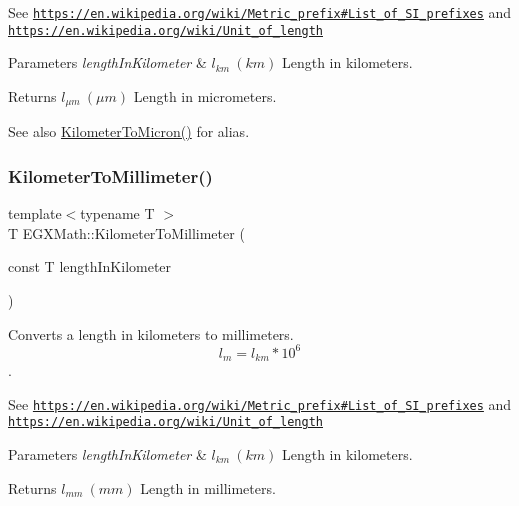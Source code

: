 See \href{https://en.wikipedia.org/wiki/Metric_prefix#List_of_SI_prefixes}{\tt https\+://en.\+wikipedia.\+org/wiki/\+Metric\+\_\+prefix\#\+List\+\_\+of\+\_\+\+S\+I\+\_\+prefixes} and \href{https://en.wikipedia.org/wiki/Unit_of_length}{\tt https\+://en.\+wikipedia.\+org/wiki/\+Unit\+\_\+of\+\_\+length} 
\begin{DoxyParams}{Parameters}
{\em length\+In\+Kilometer} & $ l_{km}\ (km)$ Length in kilometers. \\
\hline
\end{DoxyParams}
\begin{DoxyReturn}{Returns}
$ l_{\mu m}\ (\mu m)$ Length in micrometers. 
\end{DoxyReturn}
\begin{DoxySeeAlso}{See also}
\mbox{\hyperlink{group___e_g_x_math-_conversions-_length_conversions-_kilometer-_non-_s_i_gae662bafe0d1fc36276a336fd969307a0}{Kilometer\+To\+Micron()}} for alias. 
\end{DoxySeeAlso}
\mbox{\label{group___e_g_x_math-_conversions-_length_conversions-_kilometer-_s_i_ga109bb9ca348173d3bfd643a4e3bd3686}} 
\subsubsection{\texorpdfstring{Kilometer\+To\+Millimeter()}{KilometerToMillimeter()}}
{\footnotesize\ttfamily template$<$typename T $>$ \\
T E\+G\+X\+Math\+::\+Kilometer\+To\+Millimeter (\begin{DoxyParamCaption}\item[{const T}]{length\+In\+Kilometer }\end{DoxyParamCaption})}



Converts a length in kilometers to millimeters. \[ l_{m}=l_{km} * 10^{6} \]. 

See \href{https://en.wikipedia.org/wiki/Metric_prefix#List_of_SI_prefixes}{\tt https\+://en.\+wikipedia.\+org/wiki/\+Metric\+\_\+prefix\#\+List\+\_\+of\+\_\+\+S\+I\+\_\+prefixes} and \href{https://en.wikipedia.org/wiki/Unit_of_length}{\tt https\+://en.\+wikipedia.\+org/wiki/\+Unit\+\_\+of\+\_\+length} 
\begin{DoxyParams}{Parameters}
{\em length\+In\+Kilometer} & $ l_{km}\ (km)$ Length in kilometers. \\
\hline
\end{DoxyParams}
\begin{DoxyReturn}{Returns}
$ l_{mm}\ (mm)$ Length in millimeters. 
\end{DoxyReturn}
\mbox{\label{group___e_g_x_math-_conversions-_length_conversions-_kilometer-_s_i_gaa2272319841906222fd95dc1c3e90549}} 
